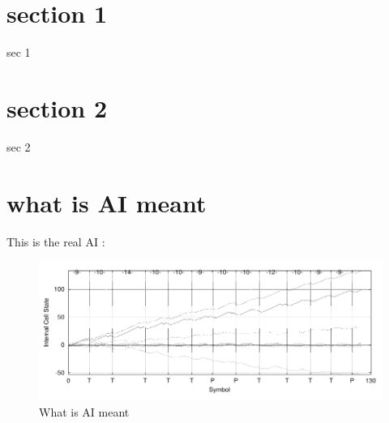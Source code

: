 \section{section 1}
sec 1
\section{section 2}
sec 2
\section{what is AI meant}
This is the real AI \cite{Bengio13representationlearning}: 
\begin{figure}[htbp] %
   \centering
   \includegraphics[width=15cm]{../images/Gers00-ForgetLSTM-fig7-internalStateDrift.png} 
   \caption{What is AI meant}
   \label{fig:ai}
\end{figure}